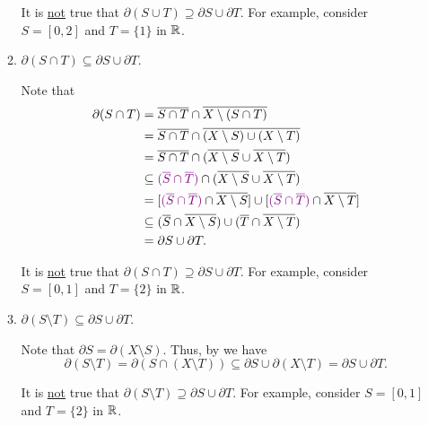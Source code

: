 \begin{enumerate}
\begin{enumerate}
\begin{warning}
It is \underline{not} true that \(\partial(S\cup T)\supseteq \partial
S\cup\partial T\). For example, consider \(S=[0,2]\) and \(T=\{1\}\) in \(\mathbb{R}\).
\end{warning}
\item \label{it:bound-inter-subset} \(\partial(S\cap T)\subseteq \partial S\cup\partial T\).

\begin{pf}
Note that
\begin{align*}
\partial(S\cap T)
&=\overline{S\cap T}\cap\overline{X\setminus (S\cap T)}\\
&=\overline{S\cap T}\cap\overline{(X\setminus S)\cup (X\setminus T)}\\
&=\overline{S\cap T}\cap (\overline{X\setminus S}\cup \overline{X\setminus T})\\
&\subseteq {\color{violet}(\overline{S}\cap\overline{T})}\cap(\overline{X\setminus S}\cup \overline{X\setminus T})\\
&=[{\color{violet}(\overline{S}\cap\overline{T})}\cap\overline{X\setminus S}]
\cup[{\color{violet}(\overline{S}\cap\overline{T})}\cap\overline{X\setminus T}]\\
&\subseteq (\overline{S}\cap\overline{X\setminus S})
\cup(\overline{T}\cap\overline{X\setminus T})\\
&=\partial S\cup\partial T.
\end{align*}
\end{pf}

\begin{warning}
It is \underline{not} true that \(\partial(S\cap T)\supseteq \partial
S\cup\partial T\). For example, consider \(S=[0,1]\) and \(T=\{2\}\) in \(\mathbb{R}\).
\end{warning}

\item \(\partial(S\setminus T)\subseteq \partial S\cup\partial T\).

\begin{pf}
Note that \(\partial S=\partial(X\setminus S)\). Thus, by
 we have
\[
\partial(S\setminus T)=\partial(S\cap(X\setminus T))
\subseteq \partial S\cup\partial(X\setminus T)
=\partial S\cup\partial T.
\]
\end{pf}

\begin{warning}
It is \underline{not} true that \(\partial(S\setminus T)\supseteq \partial
S\cup\partial T\). For example, consider \(S=[0,1]\) and \(T=\{2\}\) in \(\mathbb{R}\).
\end{warning}
\end{enumerate}
\end{enumerate}
